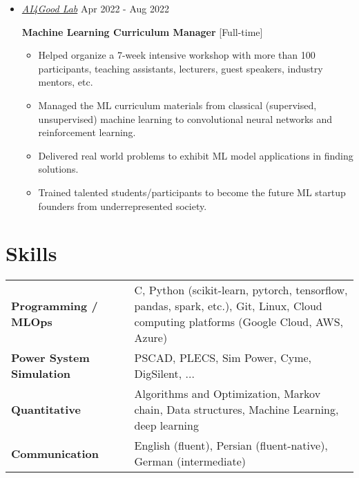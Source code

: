 \documentclass[11pt,a4paper,sans]{moderncv} %
\begin{document}
\begin{itemize}
\begin{itemize}
		\end{itemize}
	\item \href{http://ai4goodlab.com/}{ \emph{AI4Good Lab}} \hfill Apr 2022 - Aug 2022
	
	\textbf{Machine Learning Curriculum Manager} [Full-time]
	\begin{itemize}
		\item Helped organize a 7-week intensive workshop with more than 100 participants, teaching assistants, lecturers, guest speakers, industry mentors, etc.
		\item Managed the ML curriculum materials from classical (supervised, unsupervised) machine learning to convolutional neural networks and reinforcement learning.
		\item Delivered real world problems to exhibit ML model applications in finding solutions.
		\item Trained talented students/participants to become the future ML startup founders from underrepresented society.
	\end{itemize}
	\end{itemize}
	

	\section{Skills}
	\renewcommand{\arraystretch}{1.25}
	\begin{tabular}{p{7em} p{1em} p{36em}}
	\textbf{Programming / MLOps} &  &   C, Python (scikit-learn, pytorch, tensorflow, pandas, spark, etc.), Git, Linux, Cloud computing platforms (Google Cloud, AWS, Azure) \\
	\textbf{Power System Simulation} & & PSCAD, PLECS, Sim Power, Cyme, DigSilent, ...\\
		\textbf{Quantitative} & &  Algorithms and Optimization, Markov chain, Data structures, Machine Learning, deep learning\\
		\textbf{Communication} & &  English (fluent), Persian (fluent-native), German (intermediate)
	\end{tabular}
	
\end{document}
